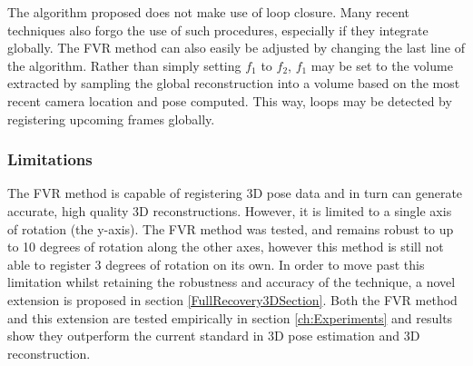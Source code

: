The algorithm proposed does not make use of loop closure. Many recent techniques also forgo the use of such procedures, especially if they integrate globally. The FVR method can also easily be adjusted by changing the last line of the algorithm. Rather than simply setting $f_1$ to $f_2$, $f_1$ may be set to the volume extracted by sampling the global reconstruction into a volume based on the most recent camera location and pose computed. This way, loops may be detected by registering upcoming frames globally. \\


\subsubsection{Limitations}

The FVR method is capable of registering 3D pose data and in turn can generate accurate, high quality 3D reconstructions. However, it is limited to a single axis of rotation (the y-axis). The FVR method was tested, and remains robust to up to 10 degrees of rotation along the other axes, however this method is still not able to register 3 degrees of rotation on its own. In order to move past this limitation whilst retaining the robustness and accuracy of the technique, a novel extension is proposed in section \ref{FullRecovery3DSection}. Both the FVR method and this extension are tested empirically in section \ref{ch:Experiments} and results show they outperform the current standard in 3D pose estimation and 3D reconstruction. \\